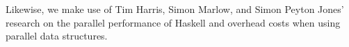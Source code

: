 Likewise, we make use of Tim Harris, Simon Marlow, and Simon Peyton Jones' research on the parallel 
performance of Haskell and overhead costs when using parallel data structures.\cite{Harris2005}









